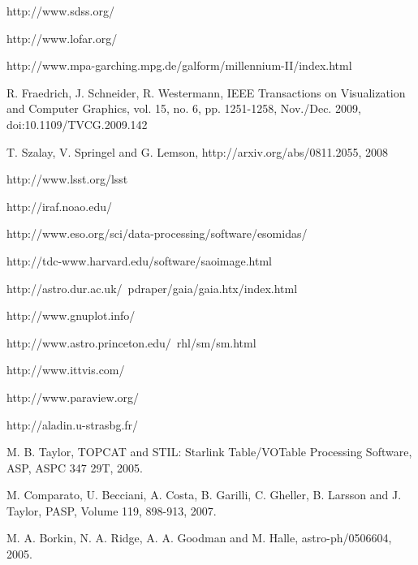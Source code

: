 \documentclass[1p,times]{elsarticle}
\begin{document}
\begin{thebibliography}{00}








 http://www.sdss.org/

 http://www.lofar.org/

http://www.mpa-garching.mpg.de/galform/millennium-II/index.html

R. Fraedrich, J. Schneider, R. Westermann, 
IEEE Transactions on Visualization and Computer Graphics, vol. 15, no. 6, pp. 1251-1258, 
Nov./Dec. 2009, doi:10.1109/TVCG.2009.142

T. Szalay, V. Springel and G. Lemson, http://arxiv.org/abs/0811.2055, 2008

http://www.lsst.org/lsst

 http://iraf.noao.edu/

 http://www.eso.org/sci/data-processing/software/esomidas/

 http://tdc-www.harvard.edu/software/saoimage.html

 http://astro.dur.ac.uk/~pdraper/gaia/gaia.htx/index.html

 http://www.gnuplot.info/

 http://www.astro.princeton.edu/~rhl/sm/sm.html

 http://www.ittvis.com/


 http://www.paraview.org/

 http://aladin.u-strasbg.fr/

 M. B. Taylor, TOPCAT and STIL: Starlink Table/VOTable Processing Software, ASP, ASPC 347 29T, 2005.

M. Comparato, U. Becciani, A. Costa, B. Garilli, C. Gheller, B. Larsson and J. Taylor, 
PASP, Volume 119, 898-913, 2007.

 M. A. Borkin, N. A. Ridge, A. A. Goodman and M. Halle, astro-ph/0506604, 2005.


\end{thebibliography}
\end{document}
